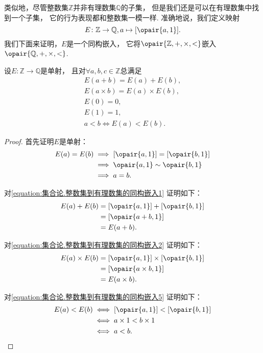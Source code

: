 类似地，尽管整数集\(\mathbb{Z}\)并非有理数集\(\mathbb{Q}\)的子集，
但是我们还是可以在有理数集中找到一个子集，
它的行为表现都和整数集一模一样.
准确地说，我们定义映射\[
	E\colon \mathbb{Z}\to\mathbb{Q}, a\mapsto[\opair{a,1}].
\]
我们下面来证明，\(E\)是一个同构嵌入，
它将\(\opair{\mathbb{Z},+,\times,<}\)嵌入\(\opair{\mathbb{Q},+,\times,<}\).
\begin{theorem}
设\(E\colon \mathbb{Z}\to\mathbb{Q}\)是单射，
且对\(\forall a,b,c\in\mathbb{Z}\)总满足\begin{gather}
	E(a+b)=E(a)+E(b),
		\label{equation:集合论.整数集到有理数集的同构嵌入1} \\
	E(a \times b)=E(a) \times E(b),
		\label{equation:集合论.整数集到有理数集的同构嵌入2} \\
	E(0)=0,
		\label{equation:集合论.整数集到有理数集的同构嵌入3} \\
	E(1)=1,
		\label{equation:集合论.整数集到有理数集的同构嵌入4} \\
	a<b \iff E(a)<E(b).
		\label{equation:集合论.整数集到有理数集的同构嵌入5}
\end{gather}
\begin{proof}
首先证明\(E\)是单射：
\begin{align*}
	E(a) = E(b)
	&\implies
	[\opair{a,1}] = [\opair{b,1}] \\
	&\implies
	\opair{a,1} \sim \opair{b,1} \\
	&\implies
	a = b.
\end{align*}

对\cref{equation:集合论.整数集到有理数集的同构嵌入1} 证明如下：
\begin{align*}
	E(a) + E(b)
	&= [\opair{a,1}] + [\opair{b,1}] \\
	&= [\opair{a+b,1}] \\
	&= E(a+b).
\end{align*}

对\cref{equation:集合论.整数集到有理数集的同构嵌入2} 证明如下：
\begin{align*}
	E(a) \times E(b)
	&= [\opair{a,1}] \times [\opair{b,1}] \\
	&= [\opair{a \times b,1}] \\
	&= E(a \times b).
\end{align*}

对\cref{equation:集合论.整数集到有理数集的同构嵌入5} 证明如下：
\begin{align*}
	E(a) < E(b)
	&\iff
	[\opair{a,1}] < [\opair{b,1}] \\
	&\iff
	a \times 1 < b \times 1 \\
	&\iff
	a < b.
	\qedhere
\end{align*}
\end{proof}
\end{theorem}

